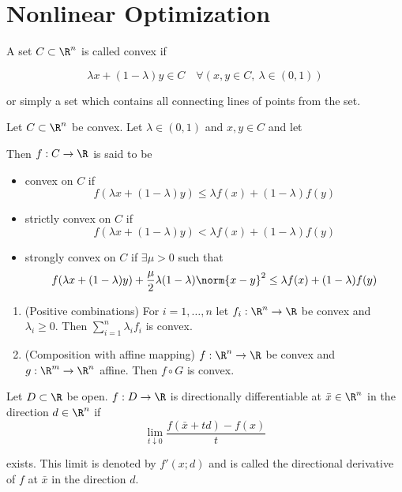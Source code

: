 \section{Nonlinear Optimization}\label{d1c9db1}

\label{e012971}

A set $C\subset\R^n$ is called convex if

$$
	\lambda x+(1-\lambda)y\in C\quad
	\forall(x,y\in C,\ \lambda\in(0,1))
$$

or simply a set which contains all connecting lines of points from the
set.

\label{a114065}

Let $C\subset\R^n$ be convex. Let $\lambda\in(0,1)$ and $x,y\in C$ and
let

Then $f:C\to\R$ is said to be

\begin{itemize}
	\item convex on $C$ if
	      $$f(\lambda x+(1-\lambda)y)\leq\lambda f(x)+(1-\lambda)f(y)$$
	\item strictly convex on $C$ if
	      $$f(\lambda x+(1-\lambda)y)<\lambda f(x)+(1-\lambda)f(y)$$
	\item strongly convex on $C$ if $\exists\mu>0$ such that
	      $$f(\lambda x+(1-\lambda)y)+\frac{\mu}{2}\lambda(1-\lambda)\norm{x-y}^2\leq\lambda f(x)+(1-\lambda)f(y)$$
\end{itemize}

\label{ddce2a7}

\begin{enumerate}
	\item (Positive combinations) For $i=1,\ldots,n$ let $f_i:\R^n\to\R$ be
	      convex and $\lambda_i\geq0$. Then $\sum_{i=1}^n\lambda_if_i$ is
	      convex.
	\item (Composition with affine mapping) $f:\R^n\to\R$ be convex
	      and $g:\R^m\to\R^n$ affine. Then $f\circ G$ is convex.
\end{enumerate}

\label{37eb747}

Let $D\subset \R$ be open. $f:D\to\R$ is directionally differentiable
at $\bar x\in\R^n$ in the direction $d\in\R^n$ if
$$
	\lim_{t\downarrow0}\frac{f(\bar x+td)-f(x)}t
$$

exists. This limit is denoted by $f'(x;d)$ and is called the
directional derivative of $f$ at $\bar x$ in the direction $d$.

